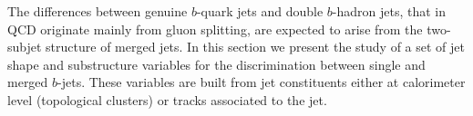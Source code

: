The differences between genuine $b$-quark jets and double $b$-hadron jets, that in QCD originate mainly from gluon splitting, are expected to arise from the two-subjet structure of merged jets. In this section we present the study of a set of jet shape and substructure variables for the discrimination between single and merged $b$-jets. These variables are  built from jet constituents either at calorimeter level (topological clusters) or tracks associated to the jet.
\\[3mm]






